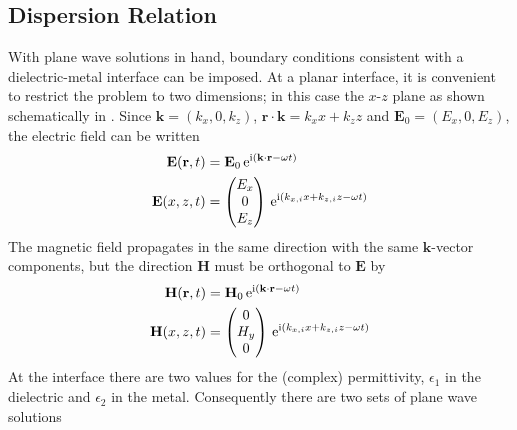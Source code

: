 \documentclass[a4paper,titlepage,onecolumn]{report}
\begin{document}
\subsection{Dispersion Relation}
With plane wave solutions in hand, boundary conditions consistent with a
dielectric-metal interface can be imposed.
At a planar interface, it is convenient to restrict the problem to two
dimensions; in this case the $x$-$z$ plane as shown schematically in
.  Since $\mathbf{k}=(k_x,0,k_z)$,
$\mathbf{r}\cdot\mathbf{k}=k_x x + k_z z$ and $\mathbf{E}_0 = (E_x, 0,
E_z)$, the electric field can be written 
\begin{align}
\mathbf{E} ( \mathbf{r}, t ) &= \mathbf{E}_0\, {\mathrm{e}}^{{\mathrm{i}} (\mathbf{k}
\cdot \mathbf{r} - \omega t )}\\
\mathbf{E}(x,z,t)&=\begin{pmatrix}
E_x\\ 0\\ E_z
\end{pmatrix}
\, {\mathrm{e}}^{{\mathrm{i}}(k_{x,i}x+k_{z,i}z-\omega t)}
\label{eqn:planewavexz}
\end{align}
The magnetic field propagates in the same direction with the
same $\mathbf{k}$-vector components, but the direction
$\mathbf{H}$ must be orthogonal to $\mathbf{E}$ by
\begin{align}
\mathbf{H} ( \mathbf{r}, t ) &= \mathbf{H}_0\, {\mathrm{e}}^{{\mathrm{i}} (\mathbf{k}
\cdot \mathbf{r} - \omega t )}\\
\mathbf{H}(x,z,t)&=\begin{pmatrix}
0\\ H_y\\ 0
\end{pmatrix}
\, {\mathrm{e}}^{{\mathrm{i}}(k_{x,i}x+k_{z,i}z-\omega t)}
\end{align}
At the interface there are two values for the (complex) permittivity,
$\epsilon_1$ in the dielectric and $\epsilon_2$ in the metal.  Consequently
there are two sets of plane wave solutions
\end{document}
